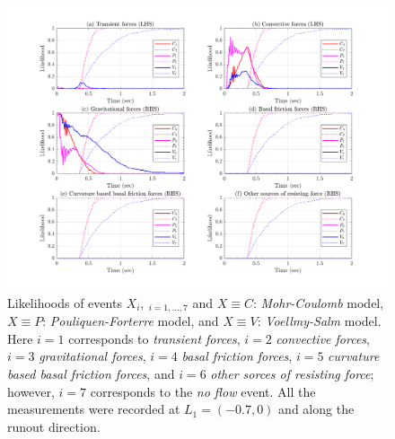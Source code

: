 \documentclass{article}
\begin{document}
\begin{figure}[H]
        \centering
        \includegraphics[width=1\textwidth]{InclinedPlane/LocalRecords/DominancePrX_L1.png}
        \caption{Likelihoods of events $X_i, \ _{i=1,...,7}$ and $X \equiv C$: \emph{Mohr-Coulomb} model, $X \equiv P$: \emph{Pouliquen-Forterre} model, and $X \equiv V$: \emph{Voellmy-Salm} model. Here $i=1$ corresponds to \emph{transient forces}, $i=2$ \emph{convective forces}, $i=3$ \emph{gravitational forces}, $i=4$ \emph{basal friction forces}, $i=5$ \emph{curvature based basal friction forces}, and $i=6$ \emph{other sorces of resisting force}; however, $i=7$ corresponds to the \emph{no flow} event. All the measurements were recorded at $L_1=(-0.7,0)$ and along the runout direction.}
        \label{fig:Ramp-FXDominance-L1}
\end{figure}
\end{document}
